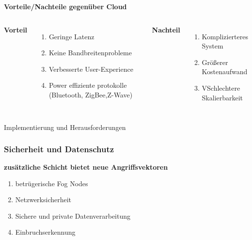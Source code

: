 \documentclass{beamer}
\begin{document}

\begin{frame}{\textbf{Vorteile/Nachteile gegenüber Cloud}}
	\begin{columns}[t] 
		
		\textbf{Vorteil}
		\begin{enumerate}
			\item Geringe Latenz
			\item Keine Bandbreitenprobleme
			\item Verbesserte User-Experience
			\item Power effiziente protokolle
			      (Bluetooth, ZigBee,Z-Wave)
		\end{enumerate}
		
		\textbf{Nachteil}
		\begin{enumerate}
			\item Komplizierteres System
			\item Größerer Kostenaufwand 
			\item VSchlechtere Skalierbarkeit 
		\end{enumerate}
	\end{columns}
\end{frame}


\begin{frame}
	\Large{\centerline{Implementierung und Herausforderungen}}
\end{frame}


\begin{frame}
	\frametitle{\textbf{Sicherheit und Datenschutz}}
	\begin{block}{\textbf{zusätzliche Schicht bietet neue Angriffsvektoren}}
		\begin{enumerate}
			\item betrügerische Fog Nodes
			\item Netzwerksicherheit
			\item Sichere und private Datenverarbeitung
			\item Einbruchserkennung
		\end{enumerate}
	\end{block}
\end{frame}

\end{document}
